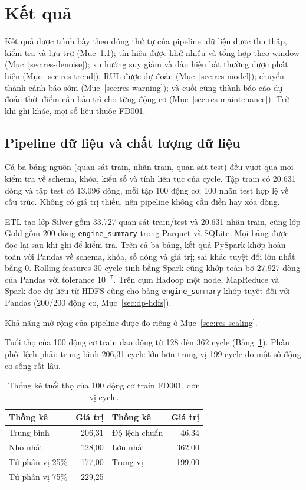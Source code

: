 \section{Kết quả}
\label{sec:results}

Kết quả được trình bày theo đúng thứ tự của pipeline: dữ liệu được thu thập,
kiểm tra và lưu trữ (Mục~\ref{sec:res-etl}); tín hiệu được khử nhiễu và tổng hợp
theo window (Mục~\ref{sec:res-denoise}); xu hướng suy giảm và dấu hiệu bất thường
được phát hiện (Mục~\ref{sec:res-trend}); RUL được dự đoán
(Mục~\ref{sec:res-model}); chuyển thành cảnh báo sớm (Mục~\ref{sec:res-warning});
và cuối cùng thành báo cáo dự đoán thời điểm cần bảo trì cho từng động cơ
(Mục~\ref{sec:res-maintenance}). Trừ khi ghi khác, mọi số liệu thuộc FD001.

\subsection{Pipeline dữ liệu và chất lượng dữ liệu}
\label{sec:res-etl}
\label{sec:res-data}
Cả ba bảng nguồn (quan sát train, nhãn train, quan sát test) đều vượt qua mọi
kiểm tra về schema, khóa, kiểu số và tính liên tục của cycle. Tập train có 20.631
dòng và tập test có 13.096 dòng, mỗi tập 100 động cơ; 100 nhãn test hợp lệ về cấu
trúc. Không có giá trị thiếu, nên pipeline không cần điền hay xóa dòng.

ETL tạo lớp Silver gồm 33.727 quan sát train/test và 20.631 nhãn train, cùng lớp
Gold gồm 200 dòng \texttt{engine\_summary} trong Parquet và SQLite. Mọi bảng được đọc lại
sau khi ghi để kiểm tra. Trên cả ba bảng, kết quả PySpark khớp hoàn toàn với
Pandas về schema, khóa, số dòng và giá trị; sai khác tuyệt đối lớn nhất bằng 0.
Rolling features 30 cycle tính bằng Spark cũng khớp toàn bộ 27.927 dòng của
Pandas với tolerance $10^{-7}$. Trên cụm Hadoop một node, MapReduce và Spark đọc
dữ liệu từ HDFS cũng cho bảng \texttt{engine\_summary} khớp tuyệt đối với Pandas (200/200
động cơ, Mục~\ref{sec:dp-hdfs}).

Khả năng mở rộng của pipeline được đo riêng ở Mục~\ref{sec:res-scaling}.

Tuổi thọ của 100 động cơ train dao động từ 128 đến 362 cycle
(Bảng~\ref{tab:lifetime}). Phân phối lệch phải: trung bình 206,31 cycle lớn hơn
trung vị 199 cycle do một số động cơ sống rất lâu.

\begin{table}[H]
\centering
\caption[Tuổi thọ train FD001]{Thống kê tuổi thọ của 100 động cơ train FD001, đơn vị cycle.}
\label{tab:lifetime}
\begin{tabular}{lr@{\qquad}lr}
\toprule Thống kê & Giá trị & Thống kê & Giá trị\\\midrule
Trung bình & 206,31 & Độ lệch chuẩn & 46,34\\
Nhỏ nhất & 128,00 & Lớn nhất & 362,00\\
Tứ phân vị 25\% & 177,00 & Trung vị & 199,00\\
Tứ phân vị 75\% & 229,25 & & \\\bottomrule
\end{tabular}
\end{table}

